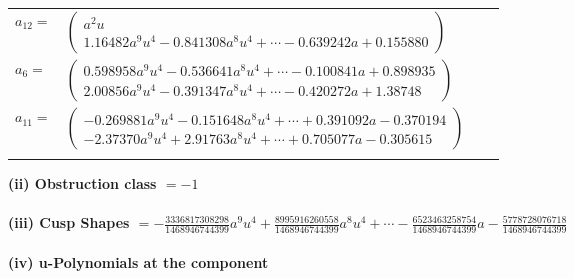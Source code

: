 \documentclass[1p]{elsarticle_modified}
\theoremstyle{definition}
\begin{document}
\begin{tabular}{m{7pt} m{180pt} m{7pt} m{180pt} }
\flushright $a_{12}=$&$\begin{pmatrix}a^2 u\\1.16482 a^{9} u^{4}-0.841308 a^{8} u^{4}+\cdots-0.639242 a+0.155880\end{pmatrix}$ \\
\flushright $a_{6}=$&$\begin{pmatrix}0.598958 a^{9} u^{4}-0.536641 a^{8} u^{4}+\cdots-0.100841 a+0.898935\\2.00856 a^{9} u^{4}-0.391347 a^{8} u^{4}+\cdots-0.420272 a+1.38748\end{pmatrix}$ \\
\flushright $a_{11}=$&$\begin{pmatrix}-0.269881 a^{9} u^{4}-0.151648 a^{8} u^{4}+\cdots+0.391092 a-0.370194\\-2.37370 a^{9} u^{4}+2.91763 a^{8} u^{4}+\cdots+0.705077 a-0.305615\end{pmatrix}$\\&\end{tabular}
\flushleft \textbf{(ii) Obstruction class $= -1$}\\~\\
\flushleft \textbf{(iii) Cusp Shapes $= -\frac{3336817308298}{1468946744399} a^9 u^4+\frac{8995916260558}{1468946744399} a^8 u^4+\cdots-\frac{6523463258754}{1468946744399} a-\frac{5778728076718}{1468946744399}$}\\~\\
\newpage\renewcommand{\arraystretch}{1}
\flushleft \textbf{(iv) u-Polynomials at the component}\newline \\
\end{document}
